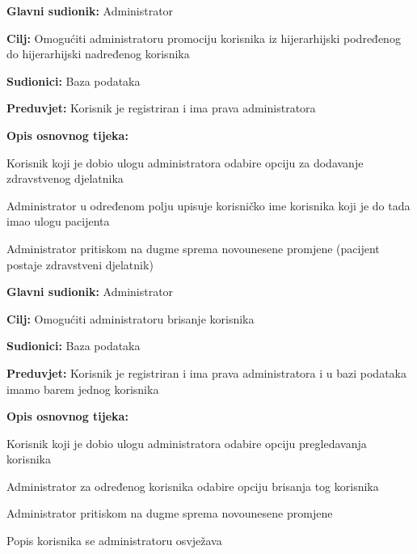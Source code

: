 \noindent {}
\begin{packed_item}
	
	\item \textbf{Glavni sudionik: }Administrator
	\item  \textbf{Cilj:} Omogućiti administratoru promociju korisnika iz hijerarhijski podređenog do hijerarhijski nadređenog korisnika
	\item  \textbf{Sudionici:} Baza podataka
	\item  \textbf{Preduvjet:} Korisnik je registriran i ima prava administratora
	\item  \textbf{Opis osnovnog tijeka:}
	
	\item[] \begin{packed_enum}
		
		\item Korisnik koji je dobio ulogu administratora odabire opciju za dodavanje zdravstvenog djelatnika
		\item Administrator u određenom polju upisuje korisničko ime korisnika koji je do tada imao ulogu pacijenta
		\item Administrator pritiskom na dugme sprema novounesene promjene (pacijent postaje zdravstveni djelatnik)
	\end{packed_enum}
	
	
\end{packed_item}


\noindent {}
\begin{packed_item}
	
	\item \textbf{Glavni sudionik: }Administrator
	\item  \textbf{Cilj:} Omogućiti administratoru brisanje korisnika
	\item  \textbf{Sudionici:} Baza podataka
	\item  \textbf{Preduvjet:} Korisnik je registriran i ima prava administratora i u bazi podataka imamo barem jednog korisnika
	\item  \textbf{Opis osnovnog tijeka:}
	
	\item[] \begin{packed_enum}
		
		\item Korisnik koji je dobio ulogu administratora odabire opciju pregledavanja korisnika
		\item Administrator za određenog korisnika odabire opciju brisanja tog korisnika
		\item Administrator pritiskom na dugme sprema novounesene promjene
		\item Popis korisnika se administratoru osvježava
	\end{packed_enum}
	
\end{packed_item}

